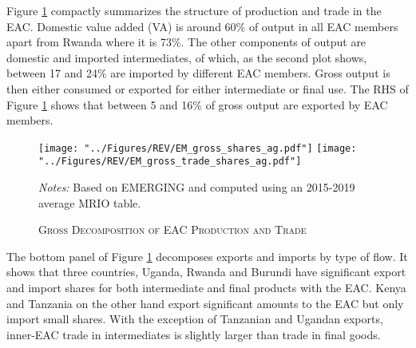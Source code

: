 \documentclass[a4paper]{article}
\begin{document}
Figure \ref{fig:shares_ag} compactly summarizes the structure of production and trade in the EAC. Domestic value added (VA) is around 60\% of output in all EAC members apart from Rwanda where it is 73\%. The other components of output are domestic and imported intermediates, of which, as the second plot shows, between 17 and 24\% are imported by different EAC members. Gross output is then either consumed or exported for either intermediate or final use. The RHS of Figure \ref{fig:shares_ag} shows that between 5 and 16\% of gross output are exported by EAC members. 
\begin{figure}[h!] \vspace{-1mm}
\centering
\caption{\label{fig:shares_ag}\textsc{Gross Decomposition of EAC Production and Trade}}
\vspace{2mm}
\texttt{[image: "../Figures/REV/EM\_gross\_shares\_ag.pdf"]} %
\texttt{[image: "../Figures/REV/EM\_gross\_trade\_shares\_ag.pdf"]} \\
\raggedright
\scriptsize
\emph{Notes:} Based on EMERGING and computed using an 2015-2019 average MRIO table. 
\end{figure}
\FloatBarrier

The bottom panel of Figure \ref{fig:shares_ag} decomposes exports and imports by type of flow. It shows that three countries, Uganda, Rwanda and Burundi have significant export and import shares for both intermediate and final products with the EAC. Kenya and Tanzania on the other hand export significant amounts to the EAC but only import small shares. With the exception of Tanzanian and Ugandan exports, inner-EAC trade in intermediates is slightly larger than trade in final goods. \newline
\end{document}
